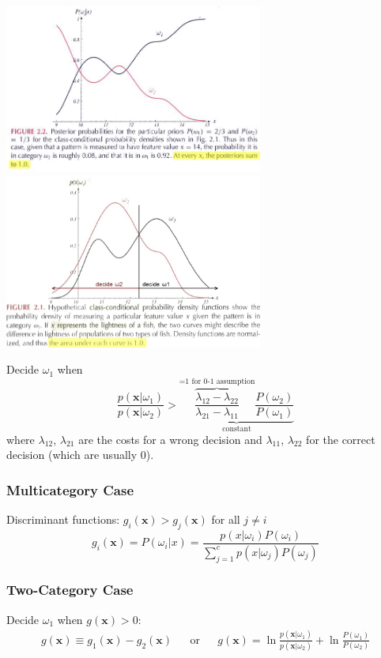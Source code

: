 \begin{minipage}{9cm}
  \includegraphics[width=8.5cm]{./images/posterior-prob.jpg}\\
  \includegraphics[width=8.5cm]{./images/class-cond-prob.jpg}
\end{minipage}

Decide $\omega_1$ when
$$\frac{p(\mathbf{x}|\omega_1)}{p(\mathbf{x}|\omega_2)} > \underbrace{
\overbrace{\frac{\lambda_{12} - \lambda_{22}}{\lambda_{21} - \lambda_{11}}}^{\text{=1 for 0-1 assumption}} \frac{P(\omega_2)}{P(\omega_1)}}_{\text{constant}}$$
where $\lambda_{12}$, $\lambda_{21}$ are the costs for a wrong decision and 
$\lambda_{11}$, $\lambda_{22}$ for the correct decision (which are usually $0$).

\begin{multicols}{2}
    \subsubsection{Multicategory Case}
    Discriminant functions: $g_i(\mathbf{x}) > g_j(\mathbf{x})$ for all $j \neq i$
    $$g_i(\mathbf{x}) = P(\omega_i|x) = 
    \frac{p(x|\omega_i) P(\omega_i)}{\sum\limits_{j=1}^{c}p(x|\omega_j) P(\omega_j)}$$
    
    \subsubsection{Two-Category Case}
    Decide $\omega_1$ when $g(\mathbf{x}) > 0$:
    \begin{align*}
        g(\mathbf{x}) \equiv g_1(\mathbf{x}) - g_2(\mathbf{x})
        &&\text{or}&&
        g(\mathbf{x}) = \ln \frac{p(\mathbf{x}|\omega_1)}{p(\mathbf{x}|\omega_2)} + \ln \frac{P(\omega_1)}{P(\omega_2)} 
    \end{align*}

\end{multicols}

